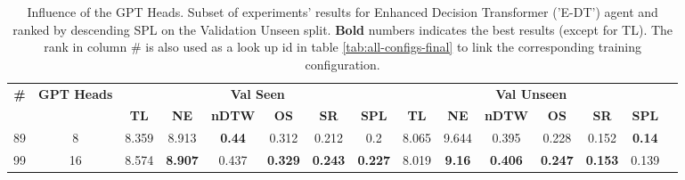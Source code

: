 \begin{table}
\centering
\caption{\label{tab:e_dt_heads}Influence of the GPT Heads. Subset of experiments' results for Enhanced Decision Transformer ('E-DT') agent and ranked by descending SPL on the Validation Unseen split. \textbf{Bold} numbers indicates the best results (except for TL). The rank in column \# is also used as a look up id in table \ref{tab:all-configs-final} to link the corresponding training configuration.}
\begin{tabular}{@{\hskip3pt}c@{\hskip3pt}c@{\hskip3pt}c@{\hskip3pt}c@{\hskip3pt}c@{\hskip3pt}c@{\hskip3pt}c@{\hskip3pt}c@{\hskip3pt}c@{\hskip3pt}c@{\hskip3pt}c@{\hskip3pt}c@{\hskip3pt}c@{\hskip3pt}c@{\hskip3pt}c}
\toprule
                                  \textbf{\#} & \textbf{GPT Heads} & \multicolumn{6}{c}{\textbf{Val Seen}} & \multicolumn{6}{c}{\textbf{Val Unseen}} \\
\cmidrule(l){3-8}\cmidrule(l){9-14}\textbf{~} &         \textbf{~} &       \textbf{TL} &     \textbf{NE} &  \textbf{nDTW} &     \textbf{OS} &     \textbf{SR} &    \textbf{SPL} &         \textbf{TL} &    \textbf{NE} &   \textbf{nDTW} &     \textbf{OS} &     \textbf{SR} &   \textbf{SPL} \\
\midrule
                                           89 &                  8 &             8.359 &           8.913 &  \textbf{0.44} &           0.312 &           0.212 &             0.2 &               8.065 &          9.644 &           0.395 &           0.228 &           0.152 &  \textbf{0.14} \\
                                           99 &                 16 &             8.574 &  \textbf{8.907} &          0.437 &  \textbf{0.329} &  \textbf{0.243} &  \textbf{0.227} &               8.019 &  \textbf{9.16} &  \textbf{0.406} &  \textbf{0.247} &  \textbf{0.153} &          0.139 \\
\bottomrule
\end{tabular}
\end{table}
